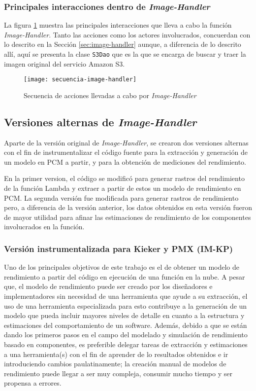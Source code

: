 \subsubsection{Principales interacciones dentro de \emph{Image-Handler}}
La figura \ref{fig:secuencia-image-handler} muestra las principales interacciones que lleva a cabo la función \emph{Image-Handler}. Tanto las acciones como los actores involucrados, concuerdan con lo descrito en la Sección \ref{sec:image-handler} aunque, a diferencia de lo descrito allí, aquí se presenta la clase \texttt{S3Dao} que es la que se encarga de buscar y traer la imagen original del servicio Amazon S3. 
\begin{figure}[h]
  \centering
  \texttt{[image: secuencia-image-handler]}
  \caption{Secuencia de acciones llevadas a cabo por \emph{Image-Handler}}
  \label{fig:secuencia-image-handler}
\end{figure}

\subsection{Versiones alternas de \emph{Image-Handler}}

Aparte de la versión original de \emph{Image-Handler}, se crearon dos versiones alternas con el fin de instrumentalizar el código fuente para la extracción y generación de un modelo en PCM a partir, y para la obtención de mediciones del rendimiento. 

En la primer version, el código se modificó para generar rastros del rendimiento de la función Lambda y extraer a partir de estos un modelo de rendimiento en PCM. La segunda versión fue modificada para generar rastros de rendimiento pero, a diferencia de la versión anterior, los datos obtenidos en esta versión fueron de mayor utilidad para afinar las estimaciones de rendimiento de los componentes involucrados en la función.

\subsubsection{Versión instrumentalizada para Kieker y PMX (IM-KP)} \label{sec:image-handler-kieker-pmx}

Uno de los principales objetivos de este trabajo es el de obtener un modelo de rendimiento a partir 
del código en ejecución de una función en la nube. A pesar que, el modelo de rendimiento puede ser creado por los diseñadores e implementadores sin necesidad de una herramienta que ayude a su extracción, el uso de una herramienta especializada para esto contribuye a la generación de un modelo que pueda incluir mayores niveles de detalle en cuanto a la estructura y estimaciones del comportamiento de un software. Además, debido a que se están dando los primeros pasos en el campo del modelado y simulación de rendimiento basado en componentes, es preferible delegar tareas de extracción y estimaciones a una herramienta(s) con el fin de aprender de lo resultados obtenidos e ir introduciendo cambios paulatinamente; la creación manual de modelos de rendimiento puede llegar a ser muy compleja, consumir mucho tiempo y ser propensa a errores. 

